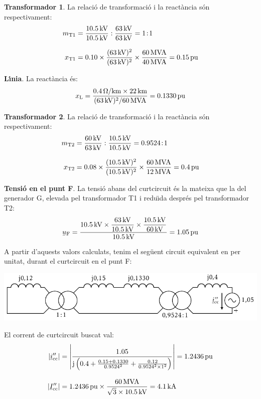 \begin{exemple}
    \textbf{Transformador 1}. La relaci\'{o} de transformaci\'{o} i la react\`{a}ncia s\'{o}n respectivament:
    \begin{align*}
    m_\mathrm{T1} &= \frac{\SI{10,5}{kV}}{\SI{10,5}{kV}} :
    \frac{\SI{63}{kV}}{\SI{63}{kV}} = 1\!:\!1 \\[3mm]
    x_\mathrm{T1} &= \num{0,10} \times \frac{(\SI{63}{kV})^2}{(\SI{63}{kV})^2} \times
    \frac{\SI{60}{MVA}}{\SI{40}{MVA}}  = \SI{0,15}{pu}
    \end{align*}

    \textbf{L\'{\i}nia}. La react\`{a}ncia \'{e}s:
    \[
    x_\mathrm{L} = \frac{\SI{0,4}{\ensuremath{\mathrm{\Omega}}/km} \times \SI{22}{km}} {(\SI{63}{kV})^2/\SI{60}{MVA}}  =
    \SI{0,1330}{pu}
    \]

    \textbf{Transformador 2}. La relaci\'{o} de transformaci\'{o} i la react\`{a}ncia s\'{o}n respectivament:
    \begin{align*}
    m_\mathrm{T2} &= \frac{\SI{60}{kV}}{\SI{63}{kV}} :
    \frac{\SI{10,5}{kV}}{\SI{10,5}{kV}} = \num{0,9524}\!:\!1 \\[3mm]
    x_\mathrm{T2} &= \num{0,08} \times \frac{(\SI{10,5}{kV})^2}{(\SI{10,5}{kV})^2} \times
    \frac{\SI{60}{MVA}}{\SI{12}{MVA}}  = \SI{0,4}{pu}
    \end{align*}

    \textbf{Tensi\'{o} en el punt F}. La tensi\'{o} abans del curtcircuit \'{e}s la mateixa que la del generador G, elevada pel transformador T1 i redu\"{\i}da despr\'{e}s pel transformador T2:
    \[
    \cmplx{u}\ped{F} = \frac{\SI{10,5}{kV} \times
    \dfrac{\SI{63}{kV}}{\SI{10,5}{kV}} \times
    \dfrac{\SI{10,5}{kV}}{\SI{60}{kV}}}{\SI{10,5}{kV}} = \SI{1,05}{pu}
    \]

    A partir d'aquests valors calculats, tenim el seg\"{u}ent circuit equivalent en per unitat, durant el
    curtcircuit en el punt F:

    \begin{center}
       \includegraphics{Imatges/Cap-Fonaments-pu-Circuit2.pdf}
    \end{center}

    El corrent de curtcircuit buscat val:
    \begin{align*}
    |\cmplx{i}''\ped{cc}| &= \left| \frac{\num{1,05}}{\ju \left( \num{0,4} + \frac{\num{0,15} + \num{0,1330}}{\num{0,9524}^2} + \frac{\num{0,12}}{\num{0,9524}^2 \times 1^2} \right)} \right| =
     \SI{1,2436}{pu} \\[3mm]
     |\cmplx{I}''\ped{cc}| &= \SI{1,2436}{pu}\times\frac{\SI{60}{MVA}}{\sqrt{3}\times \SI{10,5}{kV}} =
     \SI{4,1}{kA}
    \end{align*}


\end{exemple}
